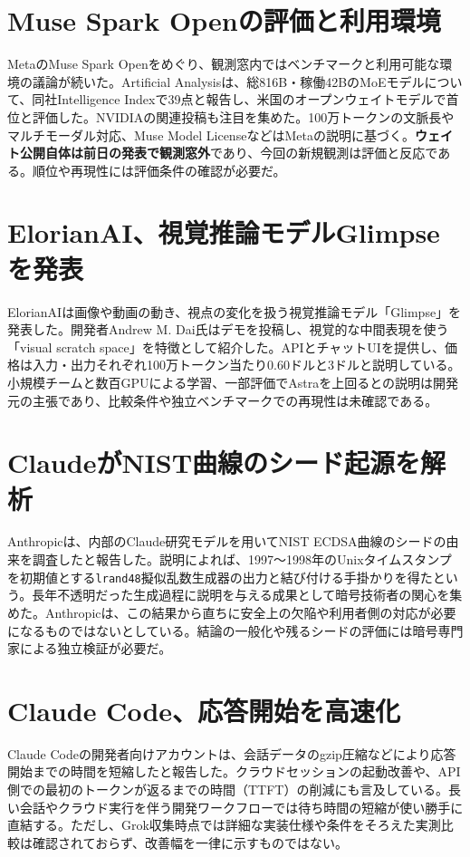 \section{Muse Spark Openの評価と利用環境}
MetaのMuse Spark Openをめぐり、観測窓内ではベンチマークと利用可能な環境の議論が続いた。Artificial Analysisは、総816B・稼働42BのMoEモデルについて、同社Intelligence Indexで39点と報告し、米国のオープンウェイトモデルで首位と評価した。NVIDIAの関連投稿も注目を集めた。100万トークンの文脈長やマルチモーダル対応、Muse Model LicenseなどはMetaの説明に基づく。\textbf{ウェイト公開自体は前日の発表で観測窓外}であり、今回の新規観測は評価と反応である。順位や再現性には評価条件の確認が必要だ。

\section{ElorianAI、視覚推論モデルGlimpseを発表}
ElorianAIは画像や動画の動き、視点の変化を扱う視覚推論モデル「Glimpse」を発表した。開発者Andrew M. Dai氏はデモを投稿し、視覚的な中間表現を使う「visual scratch space」を特徴として紹介した。APIとチャットUIを提供し、価格は入力・出力それぞれ100万トークン当たり0.60ドルと3ドルと説明している。小規模チームと数百GPUによる学習、一部評価でAstraを上回るとの説明は開発元の主張であり、比較条件や独立ベンチマークでの再現性は未確認である。

\section{ClaudeがNIST曲線のシード起源を解析}
Anthropicは、内部のClaude研究モデルを用いてNIST ECDSA曲線のシードの由来を調査したと報告した。説明によれば、1997～1998年のUnixタイムスタンプを初期値とする\texttt{lrand48}擬似乱数生成器の出力と結び付ける手掛かりを得たという。長年不透明だった生成過程に説明を与える成果として暗号技術者の関心を集めた。Anthropicは、この結果から直ちに安全上の欠陥や利用者側の対応が必要になるものではないとしている。結論の一般化や残るシードの評価には暗号専門家による独立検証が必要だ。

\section{Claude Code、応答開始を高速化}
Claude Codeの開発者向けアカウントは、会話データのgzip圧縮などにより応答開始までの時間を短縮したと報告した。クラウドセッションの起動改善や、API側での最初のトークンが返るまでの時間（TTFT）の削減にも言及している。長い会話やクラウド実行を伴う開発ワークフローでは待ち時間の短縮が使い勝手に直結する。ただし、Grok収集時点では詳細な実装仕様や条件をそろえた実測比較は確認されておらず、改善幅を一律に示すものではない。

